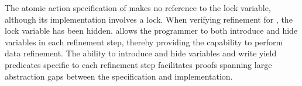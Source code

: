 The atomic action specification of  makes no reference to the lock variable, 
although its implementation involves a lock. 
When verifying refinement for , the lock variable has been hidden. 
\civl allows the programmer to both introduce and hide variables in each refinement step,
thereby providing the capability to perform data refinement.
The ability to introduce and hide variables and write yield predicates specific to each refinement step 
facilitates proofs spanning large abstraction gaps between the specification and implementation.
